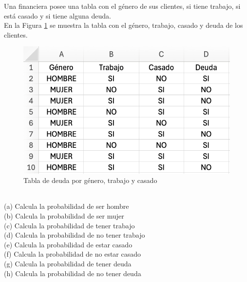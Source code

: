\documentclass{article}
\begin{document}
Una financiera posee una tabla con el género de sus clientes, si tiene trabajo, si está casado y si tiene alguna deuda.
\\[12pt]
En la Figura \ref{fig:p201} se muestra la tabla con el género, trabajo, casado y deuda de los clientes.
\begin{figure}[!ht]
    \centering
    \begin{minipage}{\textwidth}
        \centering
        \includegraphics[width=\textwidth]{figures/p201.png}
    \end{minipage}
    \captionsetup{width=0.9\textwidth}
    \caption{Tabla de deuda por género, trabajo y casado}
    \label{fig:p201}
\end{figure}
\\
(a) Calcula la probabilidad de ser hombre
\\[6pt]
(b) Calcula la probabilidad de ser mujer
\\[6pt]
(c) Calcula la probabilidad de tener trabajo
\\[6pt]
(d) Calcula la probabilidad de no tener trabajo
\\[6pt]
(e) Calcula la probabilidad de estar casado
\\[6pt]
(f) Calcula la probabilidad de no estar casado
\\[6pt]
(g) Calcula la probabilidad de tener deuda
\\[6pt]
(h) Calcula la probabilidad de no tener deuda

\clearpage
\end{document}
